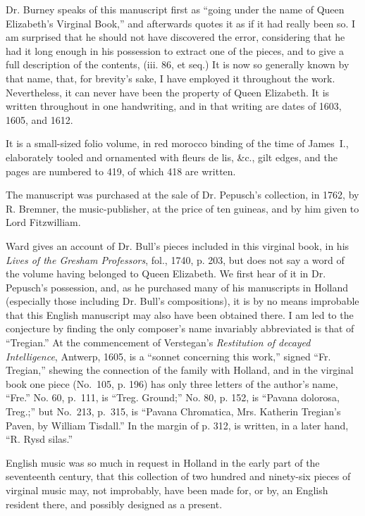 Dr. Burney speaks of this manuscript first as “going under the name of Queen
Elizabeth’s Virginal Book,” and afterwards quotes it as if it had really been so.
I am surprised that he should not have discovered the error, considering that he had it
long enough in his possession to extract one of the pieces, and to give a full description
of the contents, (iii. 86, et seq.) It is now so generally known by that name,
that, for brevity’s sake, I have employed it throughout the work. Nevertheless, it
can never have been the property of Queen Elizabeth. It is written throughout in
one handwriting, and in that writing are dates of 1603, 1605, and 1612.

It is a small-sized folio volume, in red morocco binding of the time of James~I.,
elaborately tooled and ornamented with fleurs de lis, \&c., gilt edges, and the pages
are numbered to 419, of which 418 are written.

The manuscript was purchased at the sale of Dr. Pepusch’s collection, in 1762, by
R. Bremner, the music-publisher, at the price of ten guineas, and by him given to
Lord Fitzwilliam.

Ward gives an account of Dr. Bull’s pieces included in this virginal book, in his
\textit{Lives of the Gresham Professors}, fol., 1740, p. 203, but does not say a word of the
volume having belonged to Queen Elizabeth. We first hear of it in Dr. Pepusch’s
possession, and, as he purchased many of his manuscripts in Holland (especially those
including Dr. Bull’s compositions), it is by no means improbable that this English
manuscript may also have been obtained there. I am led to the conjecture by finding 
the only composer’s name invariably abbreviated is that of “Tregian.” At the commencement
of Verstegan’s 
\pagebreak
\textit{Restitution of decayed Intelligence}, Antwerp, 1605, is a
“sonnet concerning this work,” signed “Fr. Tregian,” shewing the connection of
the family with Holland, and in the virginal book one piece (No.~105, p. 196) has
only three letters of the author’s name, “Fre.” No. 60, p.~111, is “Treg. Ground;”
No. 80, p. 152, is “Pavana dolorosa, Treg.;” but No.~213, p.~315, is “Pavana
Chromatica, Mrs. Katherin Tregian’s Paven, by William Tisdall.” In the margin of
p. 312, is written, in a later hand, “R. Rysd silas.”

English music was so much in request in Holland in the early part of the seventeenth
century, that this collection of two hundred and ninety-six pieces of virginal
music may, not improbably, have been made for, or by, an English resident there,
and possibly designed as a present.

